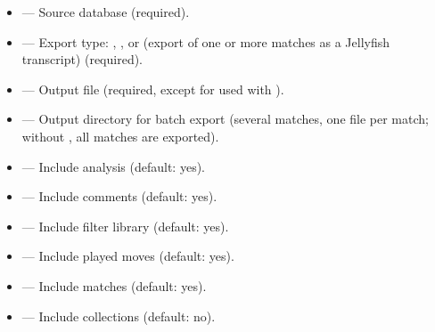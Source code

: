 \documentclass[letterpaper,10pt,english]{sphinxmanual}
\begin{document}
\sphinxAtStartPar
{}
\begin{itemize}
\item {} 
\sphinxAtStartPar
{} — Source database (required).

\item {} 
\sphinxAtStartPar
{} — Export type: , ,  or  (export of one or more matches as a Jellyfish  transcript) (required).

\item {} 
\sphinxAtStartPar
{} — Output file (required, except for  used with ).

\item {} 
\sphinxAtStartPar
{} — Output directory for batch  export (several matches, one file per match; without , all matches are exported).

\item {} 
\sphinxAtStartPar
{} — Include analysis (default: yes).

\item {} 
\sphinxAtStartPar
{} — Include comments (default: yes).

\item {} 
\sphinxAtStartPar
{} — Include filter library (default: yes).

\item {} 
\sphinxAtStartPar
{} — Include played moves (default: yes).

\item {} 
\sphinxAtStartPar
{} — Include matches (default: yes).

\item {} 
\sphinxAtStartPar
{} — Include collections (default: no).


\end{itemize}
\end{document}
